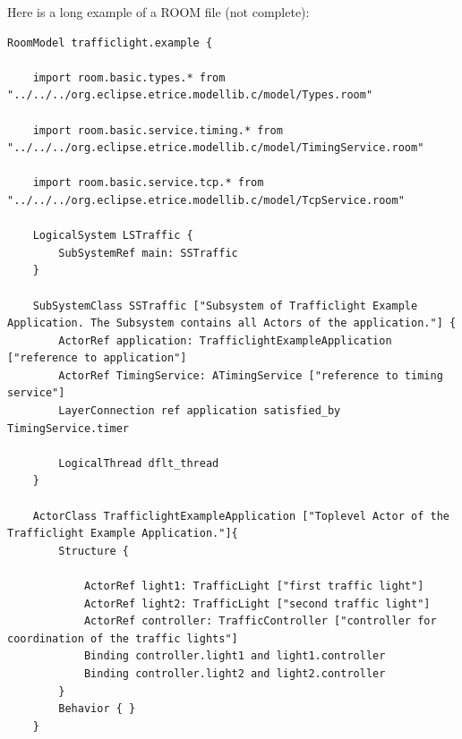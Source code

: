 Here is a long example of a ROOM file (not complete):

\begin{lstlisting}[language=ROOM]
RoomModel trafficlight.example {

	import room.basic.types.* from "../../../org.eclipse.etrice.modellib.c/model/Types.room"

	import room.basic.service.timing.* from "../../../org.eclipse.etrice.modellib.c/model/TimingService.room"

	import room.basic.service.tcp.* from "../../../org.eclipse.etrice.modellib.c/model/TcpService.room"

	LogicalSystem LSTraffic {
		SubSystemRef main: SSTraffic
	}
	
	SubSystemClass SSTraffic ["Subsystem of Trafficlight Example Application. The Subsystem contains all Actors of the application."] {
		ActorRef application: TrafficlightExampleApplication ["reference to application"]
		ActorRef TimingService: ATimingService ["reference to timing service"]
		LayerConnection ref application satisfied_by TimingService.timer 
	
		LogicalThread dflt_thread
	}

	ActorClass TrafficlightExampleApplication ["Toplevel Actor of the Trafficlight Example Application."]{
		Structure {
			
			ActorRef light1: TrafficLight ["first traffic light"]
			ActorRef light2: TrafficLight ["second traffic light"]
			ActorRef controller: TrafficController ["controller for coordination of the traffic lights"]
			Binding controller.light1 and light1.controller 
			Binding controller.light2 and light2.controller
		}
		Behavior { }
	}


\end{lstlisting}
